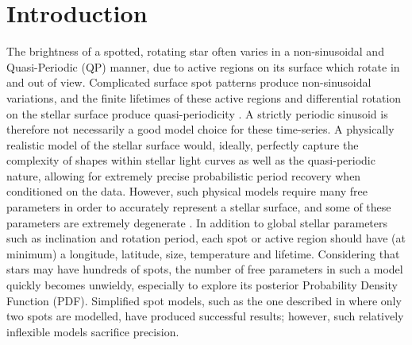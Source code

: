 \documentclass[useAMS, usenatbib, preprint, 12pt]{aastex}
\newcommand{\eg}{{\it e.g.}}
\begin{document}
\section{Introduction}
\label{sec:intro}

The brightness of a spotted, rotating star often varies in a non-sinusoidal and
Quasi-Periodic (QP) manner, due to active regions on its surface which
rotate in and out of view.
Complicated surface spot patterns produce non-sinusoidal variations,
and the finite lifetimes of these active regions and
differential rotation on the stellar surface produce quasi-periodicity
\citep{Dumusque2011}.
A strictly periodic sinusoid is therefore not necessarily a good model choice
for these time-series.
A physically realistic model of the stellar surface
would, ideally,  perfectly capture the complexity of shapes
within stellar light curves as well as the quasi-periodic nature, allowing for
extremely precise probabilistic period recovery when conditioned on the data.
However, such physical models require many free parameters in order to
accurately represent a stellar surface, and some of these parameters are
extremely degenerate \citep[\eg][]{Russell1906, Jeffers2009, Kipping2012}.
In addition to global stellar parameters such as inclination and rotation
period, each spot or active region should have (at minimum) a longitude,
latitude, size, temperature and lifetime.
Considering that stars may have hundreds of spots, the number of free
parameters in such a model quickly becomes unwieldy, especially to explore its
posterior Probability Density Function (PDF).
Simplified spot models, such as the one described in \citet{Lanza2014} where
only two spots are modelled, have produced successful results; however, such
relatively inflexible models sacrifice precision.
\end{document}
